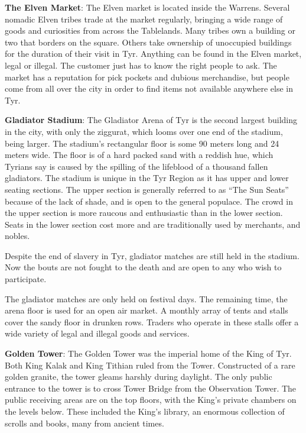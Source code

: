 {
	\textbf{The Elven Market}: The Elven market is located inside the Warrens. Several nomadic Elven tribes trade at the market regularly, bringing a wide range of goods and curiosities from across the Tablelands. Many tribes own a building or two that borders on the square. Others take ownership of unoccupied buildings for the duration of their visit in Tyr. Anything can be found in the Elven market, legal or illegal. The customer just has to know the right people to ask. The market has a reputation for pick pockets and dubious merchandise, but people come from all over the city in order to find items not available anywhere else in Tyr.

	\textbf{Gladiator Stadium}: The Gladiator Arena of Tyr is the second largest building in the city, with only the ziggurat, which looms over one end of the stadium, being larger. The stadium's rectangular floor is some 90 meters long and 24 meters wide. The floor is of a hard packed sand with a reddish hue, which Tyrians say is caused by the spilling of the lifeblood of a thousand fallen gladiators. The stadium is unique in the Tyr Region as it has upper and lower seating sections. The upper section is generally referred to as ``The Sun Seats'' because of the lack of shade, and is open to the general populace. The crowd in the upper section is more raucous and enthusiastic than in the lower section. Seats in the lower section cost more and are traditionally used by merchants, and nobles.

	Despite the end of slavery in Tyr, gladiator matches are still held in the stadium. Now the bouts are not fought to the death and are open to any who wish to participate.

	The gladiator matches are only held on festival days. The remaining time, the arena floor is used for an open air market. A monthly array of tents and stalls cover the sandy floor in drunken rows. Traders who operate in these stalls offer a wide variety of legal and illegal goods and services.

	\textbf{Golden Tower}: The Golden Tower was the imperial home of the King of Tyr. Both King Kalak and King Tithian ruled from the Tower. Constructed of a rare golden granite, the tower gleams harshly during daylight. The only public entrance to the tower is to cross Tower Bridge from the Observation Tower. The public receiving areas are on the top floors, with the King's private chambers on the levels below. These included the King's library, an enormous collection of scrolls and books, many from ancient times.

}
